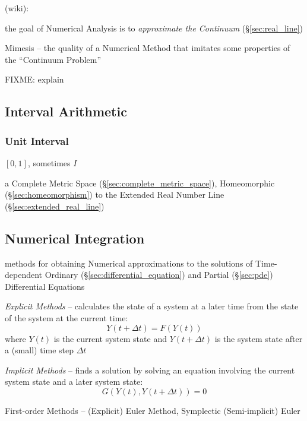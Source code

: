 (wiki):

the goal of Numerical Analysis is to \emph{approximate the Continuum}
(\S\ref{sec:real_line})

Mimesis -- the quality of a Numerical Method that imitates some properties of
the ``Continuum Problem''

FIXME: explain



\subsection{Interval Arithmetic}\label{sec:interval_arithmetic}

\subsubsection{Unit Interval}\label{sec:unit_interval}

$[0,1]$, sometimes $I$

a Complete Metric Space (\S\ref{sec:complete_metric_space}),
Homeomorphic (\S\ref{sec:homeomorphism}) to the Extended Real Number
Line (\S\ref{sec:extended_real_line})



\subsection{Numerical Integration}\label{sec:numerical_integration}

methods for obtaining Numerical approximations to the solutions of
Time-dependent Ordinary (\S\ref{sec:differential_equation}) and Partial
(\S\ref{sec:pde}) Differential Equations

\emph{Explicit Methods} -- calculates the state of a system at a later time
from the state of the system at the current time:
\[
  Y(t+\Delta{t}) = F(Y(t))
\]
where $Y(t)$ is the current system state and $Y(t + \Delta{t})$ is the system
state after a (small) time step $\Delta{t}$

\emph{Implicit Methods} -- finds a solution by solving an equation involving
the current system state and a later system state:
\[
  G(Y(t), Y(t + \Delta{t})) = 0
\]

First-order Methods -- (Explicit) Euler Method, Symplectic (Semi-implicit) Euler

